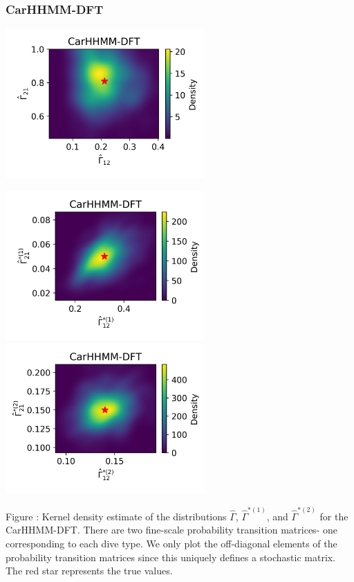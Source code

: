 \documentclass{article}
\begin{document}
        \subsubsection{CarHHMM-DFT}
        \begin{center}
        \includegraphics[width=3in]{../Plots/hhmm_FV_Gamma_density_-1.png}
        
        \includegraphics[width=3in]{../Plots/hhmm_FV_Gamma_density_0.png}
        \includegraphics[width=3in]{../Plots/hhmm_FV_Gamma_density_1.png}
        \end{center}
        
        \noindent Figure : Kernel density estimate of the distributions $\hat \Gamma$, $\hat \Gamma^{*(1)}$, and $\hat \Gamma^{*(2)}$ for the CarHHMM-DFT. There are two fine-scale probability transition matrices- one corresponding to each dive type. We only plot the off-diagonal elements of the probability transition matrices since this uniquely defines a stochastic matrix. The red star represents the true values.
        \addtocounter{fignum}{1}
        
\end{document}
